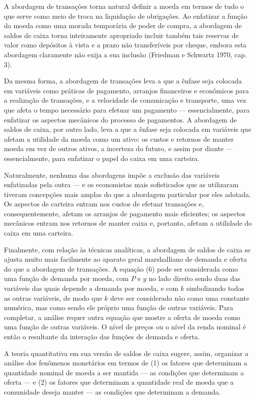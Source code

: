 \documentclass[12pt]{article}
\begin{document}
A abordagem de transações torna natural definir a moeda em termos de tudo o que serve como meio de troca na liquidação de obrigações. Ao enfatizar a função da moeda como uma morada temporária de poder de compra, a abordagem de saldos de caixa torna inteiramente apropriado incluir também tais reservas de valor como depósitos à vista e a prazo não transferíveis por cheque, embora esta abordagem claramente não exija a sua inclusão (Friedman e Schwartz 1970, cap. 3).

Da mesma forma, a abordagem de transações leva a que a ênfase seja colocada em variáveis como práticas de pagamento, arranjos financeiros e econômicos para a realização de transações, e a velocidade de comunicação e transporte, uma vez que afeta o tempo necessário para efetuar um pagamento — essencialmente, para enfatizar os aspectos mecânicos do processo de pagamentos. A abordagem de saldos de caixa, por outro lado, leva a que a ênfase seja colocada em variáveis que afetam a utilidade da moeda como um ativo: os custos e retornos de manter moeda em vez de outros ativos, a incerteza do futuro, e assim por diante — essencialmente, para enfatizar o papel do caixa em uma carteira.

Naturalmente, nenhuma das abordagens impõe a exclusão das variáveis enfatizadas pela outra — e os economistas mais sofisticados que as utilizaram tiveram concepções mais amplas do que a abordagem particular por eles adotada. Os aspectos de carteira entram nos custos de efetuar transações e, consequentemente, afetam os arranjos de pagamento mais eficientes; os aspectos mecânicos entram nos retornos de manter caixa e, portanto, afetam a utilidade do caixa em uma carteira.

Finalmente, com relação às técnicas analíticas, a abordagem de saldos de caixa se ajusta muito mais facilmente ao aparato geral marshalliano de demanda e oferta do que a abordagem de transações. A equação (6) pode ser considerada como uma função de demanda por moeda, com $P$ e $y$ no lado direito sendo duas das variáveis das quais depende a demanda por moeda, e com $k$ simbolizando todas as outras variáveis, de modo que $k$ deve ser considerado não como uma constante numérica, mas como sendo ele próprio uma função de outras variáveis. Para completar, a análise requer outra equação que mostre a oferta de moeda como uma função de outras variáveis. O nível de preços ou o nível da renda nominal é então o resultante da interação das funções de demanda e oferta.

A teoria quantitativa em sua versão de saldos de caixa sugere, assim, organizar a análise dos fenômenos monetários em termos de (1) os fatores que determinam a quantidade nominal de moeda a ser mantida — as condições que determinam a oferta — e (2) os fatores que determinam a quantidade real de moeda que a comunidade deseja manter — as condições que determinam a demanda.
\end{document}

